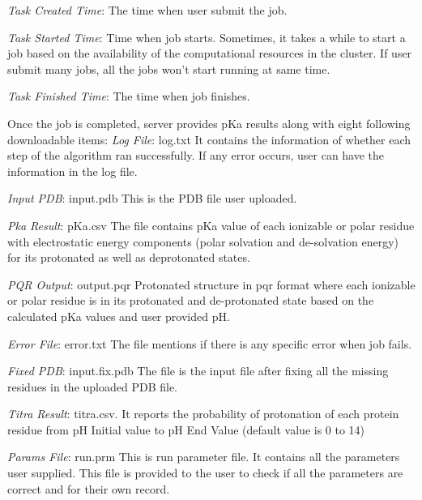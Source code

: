 \documentclass[9pt,tutorial]{livecoms}
\begin{document}
\textit{Task Created Time}: The time when user submit the job.

\textit{Task Started Time}: Time when job starts. Sometimes, it takes a while to start a job based on the availability of the computational resources in the cluster. If user submit many jobs, all the jobs won’t start running at same time.

\textit{Task Finished Time}: The time when job finishes.

Once the job is completed, server provides pKa results along with eight following downloadable items:
\textit{Log File}: log.txt It contains the information of whether each step of the algorithm ran successfully. If any error occurs, user can have the information in the log file.

\textit{Input PDB}: input.pdb This is the PDB file user uploaded.

\textit{Pka Result}: pKa.csv The file contains pKa value of each ionizable or polar residue with electrostatic energy components (polar solvation and de-solvation energy) for its protonated as well as deprotonated states.

\textit{PQR Output}: output.pqr Protonated structure in pqr format where each ionizable or polar residue is in its protonated and de-protonated state based on the calculated pKa values and user provided pH.

\textit{Error File}: error.txt The file mentions if there is any specific error when job fails.

\textit{Fixed PDB}: input.fix.pdb The file is the input file after fixing all the missing residues in the uploaded PDB file.

\textit{Titra Result}: titra.csv.   It reports the probability of protonation of each protein residue from pH Initial value to pH End Value (default value is 0 to 14)

\textit{Params File}: run.prm This is run parameter file. It contains all the parameters user supplied. This file is provided to the user to check if all the parameters are correct and for their own record. 
\end{document}
